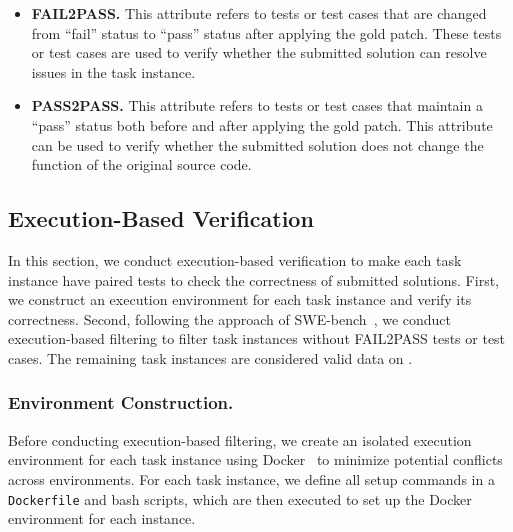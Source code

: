 \begin{itemize}[left=10pt]
    \item \textbf{FAIL2PASS.} This attribute refers to tests or test cases that are changed from ``fail'' status to ``pass'' status after applying the gold patch. These tests or test cases are used to verify whether the submitted solution can resolve issues in the task instance.
    \item \textbf{PASS2PASS.} This attribute refers to tests or test cases that maintain a ``pass'' status both before and after applying the gold patch. This attribute can be used to verify whether the submitted solution does not change the function of the original source code. 
\end{itemize}


\subsection{Execution-Based Verification} 
In this section,  we conduct execution-based verification to make each task instance have paired tests to check the correctness of submitted solutions. First, we construct an execution environment for each task instance and verify its correctness. Second, following the approach of SWE-bench~\cite{jimenez2023swe}, we conduct execution-based filtering to filter task instances without FAIL2PASS tests or test cases. The remaining task instances are considered valid data on \Swebenchx.


\subsubsection{Environment Construction.} 
Before conducting execution-based filtering, we create an isolated execution environment for each task instance using Docker~\cite{docker} to minimize potential conflicts across environments. For each task instance, we define all setup commands in a \texttt{Dockerfile} and bash scripts, which are then executed to set up the Docker environment for each instance.



